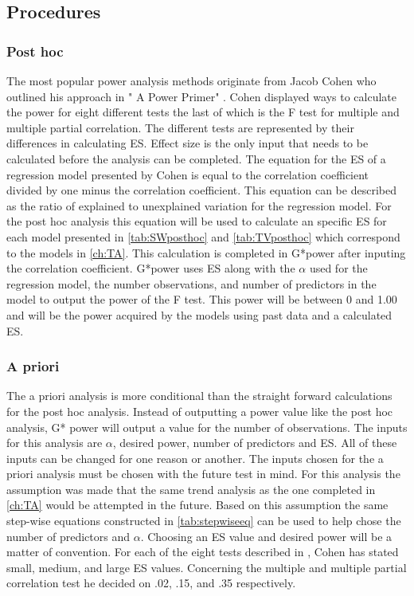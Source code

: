 \subsection{Procedures}
\subsubsection{Post hoc}

The most popular power analysis methods originate from Jacob Cohen who outlined his approach in " A Power Primer" \citep{cohen1992power}.
Cohen displayed ways to calculate the power for eight different tests the last of which is the F test for multiple and multiple partial correlation.
The different tests are represented by their differences in calculating ES.
Effect size is the only input that needs to be calculated before the analysis can be completed.
The equation for the ES of a regression model presented by Cohen is equal to the correlation coefficient divided by one minus the correlation coefficient.
This equation can be described as the ratio of explained to unexplained variation for the regression model.
For the post hoc analysis this equation will be used to calculate an specific ES for each model presented in \autoref{tab:SWposthoc} and \autoref{tab:TVposthoc} which correspond to the models in \autoref{ch:TA}.
This calculation is completed in G*power after inputing the correlation coefficient.
G*power uses ES along with the $\alpha$ used for the regression model, the number observations, and number of predictors in the model to output the power of the F test.
This power will be between 0 and 1.00 and will be the power acquired by the models using past data and a calculated ES.

\subsubsection{A priori}

The a priori analysis is more conditional than the straight forward calculations for the post hoc analysis.
Instead of outputting a power value like the post hoc analysis, G* power will output a value for the number of observations. 
The inputs for this analysis are $\alpha$, desired power, number of predictors and ES.
All of these inputs can be changed for one reason or another.
The inputs chosen for the a priori analysis must be chosen with the future test in mind.
For this analysis the assumption was made that the same trend analysis as the one completed in \autoref{ch:TA} would be attempted in the future.
Based on this assumption the same step-wise equations constructed in \autoref{tab:stepwiseeq} can be used to help chose the number of predictors and $\alpha$.
Choosing an ES value and desired power will be a matter of convention.
For each of the eight tests described in \citet{cohen1992power}, Cohen has stated small, medium, and large ES values.
Concerning the multiple and multiple partial correlation test he decided on .02, .15, and .35 respectively.



